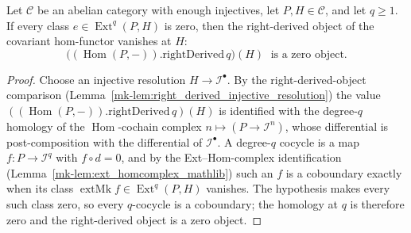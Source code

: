 \begin{lemma}
  \label{mk-lem:isZero_coyoneda_rightDerived_of_forall_ext_eq_zero}

  Let \(\mathcal{C}\) be an abelian category with enough injectives, let \(P, H \in \mathcal{C}\), and
  let \(q \geq 1\). If every class \(e \in \operatorname{Ext}^q(P, H)\) is zero, then the right-derived
  object of the covariant hom-functor vanishes at \(H\):
  \[
    \bigl((\operatorname{Hom}(P, -)).\mathrm{rightDerived}\,q\bigr)(H) \;\text{ is a zero object.}
  \]
\end{lemma}
\begin{proof}
  Choose an injective resolution \(H \to \mathcal{I}^\bullet\). By the right-derived-object comparison
  (Lemma~\ref{mk-lem:right_derived_injective_resolution}) the value
  \(((\operatorname{Hom}(P,-)).\mathrm{rightDerived}\,q)(H)\) is identified with the degree-\(q\)
  homology of the \(\operatorname{Hom}\)-cochain complex \(n \mapsto (P \to \mathcal{I}^n)\), whose
  differential is post-composition with the differential of \(\mathcal{I}^\bullet\). A degree-\(q\)
  cocycle is a map \(f : P \to \mathcal{I}^q\) with \(f \circ d = 0\), and by the
  Ext--Hom-complex identification (Lemma~\ref{mk-lem:ext_homcomplex_mathlib}) such an \(f\) is a
  coboundary exactly when its class \(\operatorname{extMk} f \in \operatorname{Ext}^q(P, H)\) vanishes.
  The hypothesis makes every such class zero, so every \(q\)-cocycle is a coboundary; the homology at
  \(q\) is therefore zero and the right-derived object is a zero object.
\end{proof}


